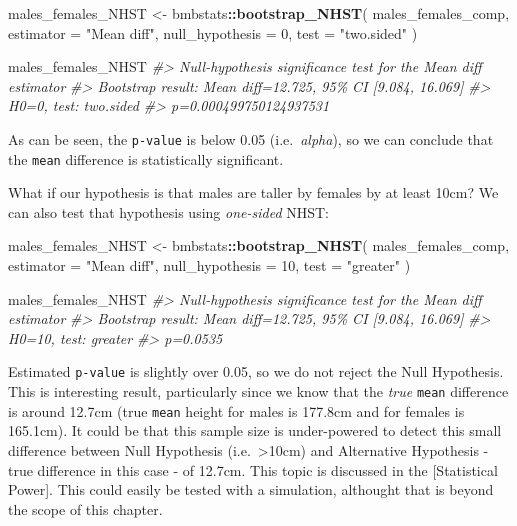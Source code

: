 \documentclass[
]{book}
\newenvironment{Shaded}{\begin{snugshade}}{\end{snugshade}}
\newcommand{\CommentTok}[1]{\textcolor[rgb]{0.56,0.35,0.01}{\textit{#1}}}
\newcommand{\DataTypeTok}[1]{\textcolor[rgb]{0.13,0.29,0.53}{#1}}
\newcommand{\DecValTok}[1]{\textcolor[rgb]{0.00,0.00,0.81}{#1}}
\newcommand{\KeywordTok}[1]{\textcolor[rgb]{0.13,0.29,0.53}{\textbf{#1}}}
\newcommand{\NormalTok}[1]{#1}
\newcommand{\OperatorTok}[1]{\textcolor[rgb]{0.81,0.36,0.00}{\textbf{#1}}}
\newcommand{\StringTok}[1]{\textcolor[rgb]{0.31,0.60,0.02}{#1}}
\begin{document}
\begin{Shaded}
\begin{Highlighting}[]
\NormalTok{males\_females\_NHST <{-}}\StringTok{ }\NormalTok{bmbstats}\OperatorTok{::}\KeywordTok{bootstrap\_NHST}\NormalTok{(}
\NormalTok{  males\_females\_comp,}
  \DataTypeTok{estimator =} \StringTok{"Mean diff"}\NormalTok{,}
  \DataTypeTok{null\_hypothesis =} \DecValTok{0}\NormalTok{,}
  \DataTypeTok{test =} \StringTok{"two.sided"}
\NormalTok{)}

\NormalTok{males\_females\_NHST}
\CommentTok{\#> Null{-}hypothesis significance test for the \textasciigrave{}Mean diff\textasciigrave{} estimator}
\CommentTok{\#> Bootstrap result: Mean diff=12.725, 95\% CI [9.084, 16.069]}
\CommentTok{\#> H0=0, test: two.sided}
\CommentTok{\#> p=0.000499750124937531}
\end{Highlighting}
\end{Shaded}

As can be seen, the \texttt{p-value} is below 0.05 (i.e.~\emph{alpha}), so we can conclude that the \texttt{mean} difference is statistically significant.

What if our hypothesis is that males are taller by females by at least 10cm? We can also test that hypothesis using \emph{one-sided} NHST:

\begin{Shaded}
\begin{Highlighting}[]
\NormalTok{males\_females\_NHST <{-}}\StringTok{ }\NormalTok{bmbstats}\OperatorTok{::}\KeywordTok{bootstrap\_NHST}\NormalTok{(}
\NormalTok{  males\_females\_comp,}
  \DataTypeTok{estimator =} \StringTok{"Mean diff"}\NormalTok{,}
  \DataTypeTok{null\_hypothesis =} \DecValTok{10}\NormalTok{,}
  \DataTypeTok{test =} \StringTok{"greater"}
\NormalTok{)}

\NormalTok{males\_females\_NHST}
\CommentTok{\#> Null{-}hypothesis significance test for the \textasciigrave{}Mean diff\textasciigrave{} estimator}
\CommentTok{\#> Bootstrap result: Mean diff=12.725, 95\% CI [9.084, 16.069]}
\CommentTok{\#> H0=10, test: greater}
\CommentTok{\#> p=0.0535}
\end{Highlighting}
\end{Shaded}

Estimated \texttt{p-value} is slightly over 0.05, so we do not reject the Null Hypothesis. This is interesting result, particularly since we know that the \emph{true} \texttt{mean} difference is around 12.7cm (true \texttt{mean} height for males is 177.8cm and for females is 165.1cm). It could be that this sample size is under-powered to detect this small difference between Null Hypothesis (i.e.~\textgreater10cm) and Alternative Hypothesis - true difference in this case - of 12.7cm. This topic is discussed in the {[}Statistical Power{]}. This could easily be tested with a simulation, althought that is beyond the scope of this chapter.
\end{document}
